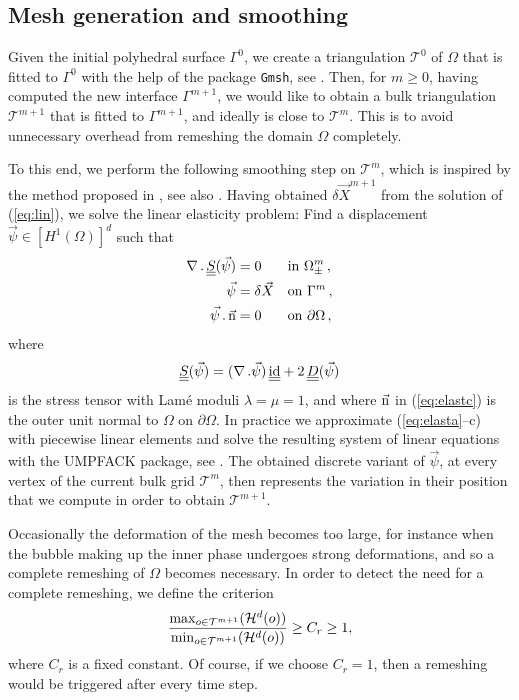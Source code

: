 \documentclass[a4paper,12pt,onecolumn]{article}
\newcommand{\sigmaO}{o}
\newcommand{\id}{\rm id}
\newcommand{\mat}[1]{\underline{\underline{#1}}\rule{0pt}{0pt}}
\begin{document}
\subsection{Mesh generation and smoothing}
Given the initial polyhedral surface $\Gamma^0$, we create a triangulation
$\mathcal{T}^0$ of $\Omega$ that is fitted to $\Gamma^0$ with the help of the 
package \verb|Gmsh|, see \cite{GeuzaineR09}.
Then, for $m \geq 0$, having computed the new interface $\Gamma^{m+1}$, we
would like to obtain a bulk triangulation $\mathcal{T}^{m+1}$ that is fitted to
$\Gamma^{m+1}$, and ideally is close to $\mathcal{T}^m$. This is to avoid
unnecessary overhead from remeshing the domain $\Omega$ completely.

To this end, we perform the following smoothing step on $\mathcal{T}^m$, which
is inspired by the method proposed in \cite{Ganesan06}, see also
\cite{GanesanT08}. Having obtained $\delta \vec X^{m+1}$ from the solution of
(\ref{eq:lin}), we solve the linear elasticity problem: Find a displacement
$\vec\psi \in [H^1(\Omega)]^d$ such that
\begin{subequations}
\begin{align}
 \nabla\,.\,\mat S(\vec\psi) &= 0 && \mbox{in }\Omega_{\pm}^m\,, 
\label{eq:elasta} \\
 \vec\psi &= \delta \vec X && \mbox{on } \Gamma^m\,, \label{eq:elastb} \\ 
 \vec\psi\,.\,\vec{\rm n} & = 0 &&\mbox{on } \partial\Omega\,, \label{eq:elastc}
\end{align}
\end{subequations}
where
\begin{equation} \label{eq:elasticity_tensor}
\mat S(\vec \psi) = (\nabla\,.\vec\psi)\,\mat\id + 2\,\mat D(\vec\psi)
\end{equation}
is the stress tensor with Lam{\'e} moduli $\lambda=\mu=1$, and where
$\vec{\rm n}$ in (\ref{eq:elastc}) is the outer unit normal to $\Omega$ on
$\partial\Omega$. In practice we approximate (\ref{eq:elasta}--c) with
piecewise linear elements and solve the resulting system of linear equations
with the UMPFACK package, see \cite{Davis04}. 
The obtained discrete variant of $\vec\psi$, at every vertex of the current 
bulk grid $\mathcal{T}^m$, then represents the variation in their
position that we compute in order to obtain $\mathcal{T}^{m+1}$.

Occasionally the deformation of the mesh becomes too large, for instance when
the bubble making up the inner phase undergoes strong deformations, and so a
complete remeshing of $\Omega$ becomes necessary. In order to detect the need
for a complete remeshing, we define the criterion
\begin{equation}\label{eq:remesh}
\frac{\max_{\sigmaO\in {\cal T}^{m+1}}(\mathcal{H}^{d}(\sigmaO))}
{\min_{\sigmaO\in\mathcal {T}^{m+1}}(\mathcal{H}^{d}(\sigmaO))} \geq C_r \geq 1,
\end{equation}
where $C_r$ is a fixed constant. Of course, if we choose $C_r = 1$, then a
remeshing would be triggered after every time step.
\end{document}
